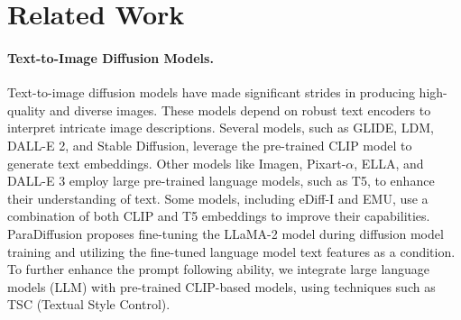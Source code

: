 
\section{Related Work} \label{sec:related_work}


\paragraph{Text-to-Image Diffusion Models.} Text-to-image diffusion models have made significant strides in producing high-quality and diverse images. These models depend on robust text encoders to interpret intricate image descriptions. Several models, such as GLIDE\cite{nichol2021glide}, LDM\cite{rombach2022high}, DALL-E 2\cite{ramesh2022hierarchical}, and Stable Diffusion\cite{rombach2022high,podell2023sdxl}, leverage the pre-trained CLIP\cite{radford2021learning} model to generate text embeddings. Other models like Imagen\cite{saharia2022photorealistic}, Pixart-$\alpha$\cite{chen2023pixart}, ELLA\cite{hu2024ella}, and DALL-E 3\cite{betker2023improving} employ large pre-trained language models, such as T5\cite{raffel2020exploring}, to enhance their understanding of text. Some models, including eDiff-I\cite{balaji2022ediffi} and EMU\cite{dai2023emu}, use a combination of both CLIP and T5 embeddings to improve their capabilities. ParaDiffusion\cite{wu2023paradiffusion} proposes fine-tuning the LLaMA-2\cite{touvron2023llama} model during diffusion model training and utilizing the fine-tuned language model text features as a condition. To further enhance the prompt following ability, we integrate large language models (LLM\cite{raffel2020exploring,touvron2023llama,zhang2024tinyllama}) with pre-trained CLIP-based models, using techniques such as TSC (Textual Style Control).



